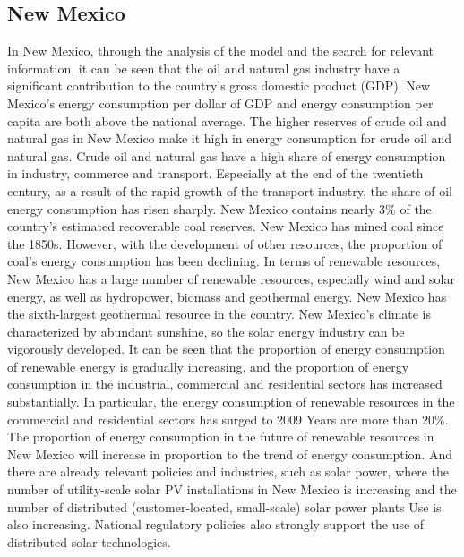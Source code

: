 \documentclass{mcmthesis}
\begin{document}
\subsection{New Mexico}
In New Mexico, through the analysis of the model and the search for relevant information, it can be seen that the oil and natural gas industry have a significant contribution to the country's gross domestic product (GDP).
New Mexico's energy consumption per dollar of GDP and energy consumption per capita are both above the national average.
The higher reserves of crude oil and natural gas in New Mexico make it high in energy consumption for crude oil and natural gas.
Crude oil and natural gas have a high share of energy consumption in industry, commerce and transport.
Especially at the end of the twentieth century, as a result of the rapid growth of the transport industry, the share of oil energy consumption has risen sharply.
New Mexico contains nearly $3\%$ of the country's estimated recoverable coal reserves.
New Mexico has mined coal since the 1850s. However, with the development of other resources, the proportion of coal's energy consumption has been declining.
In terms of renewable resources, New Mexico has a large number of renewable resources, especially wind and solar energy, as well as hydropower, biomass and geothermal energy.
New Mexico has the sixth-largest geothermal resource in the country. New Mexico's climate is characterized by abundant sunshine, so the solar energy industry can be vigorously developed.
It can be seen that the proportion of energy consumption of renewable energy is gradually increasing, and the proportion of energy consumption in the industrial, commercial and residential sectors has increased substantially.
In particular, the energy consumption of renewable resources in the commercial and residential sectors has surged to 2009 Years are more than $20\%$.
The proportion of energy consumption in the future of renewable resources in New Mexico will increase in proportion to the trend of energy consumption.
And there are already relevant policies and industries, such as solar power, where the number of utility-scale solar PV installations in New Mexico is increasing and the number of distributed (customer-located, small-scale) solar power plants Use is also increasing.
National regulatory policies also strongly support the use of distributed solar technologies.
\end{document}
